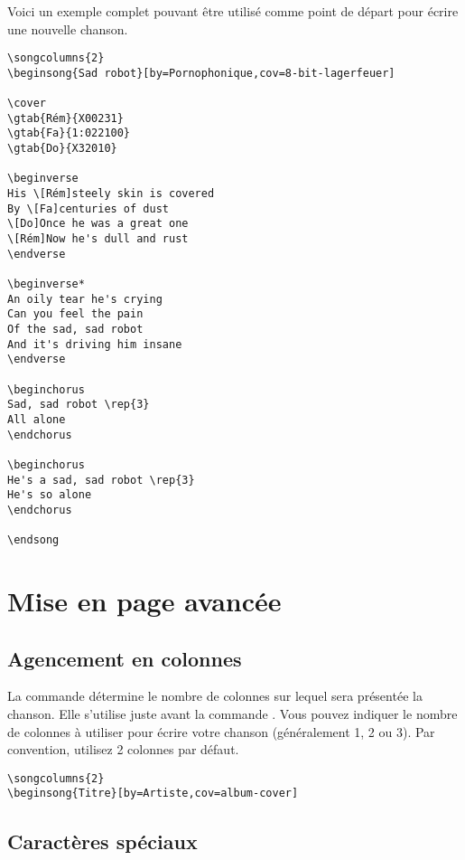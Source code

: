 \documentclass[versionenligne]{patacrep}
\begin{document}
Voici un exemple complet pouvant être utilisé comme point de départ
pour écrire une nouvelle chanson.

\begin{verbatim}
\songcolumns{2}
\beginsong{Sad robot}[by=Pornophonique,cov=8-bit-lagerfeuer]

\cover
\gtab{Rém}{X00231}
\gtab{Fa}{1:022100}
\gtab{Do}{X32010}

\beginverse
His \[Rém]steely skin is covered
By \[Fa]centuries of dust
\[Do]Once he was a great one
\[Rém]Now he's dull and rust
\endverse

\beginverse*
An oily tear he's crying
Can you feel the pain
Of the sad, sad robot
And it's driving him insane
\endverse

\beginchorus
Sad, sad robot \rep{3}
All alone
\endchorus

\beginchorus
He's a sad, sad robot \rep{3}
He's so alone
\endchorus

\endsong
\end{verbatim}

\section{Mise en page avancée}

\subsection{Agencement en colonnes}

La commande  détermine le nombre de colonnes sur
lequel sera présentée la chanson. Elle s'utilise juste avant la
commande . Vous pouvez indiquer le nombre de colonnes
à utiliser pour écrire votre chanson (généralement 1, 2 ou 3). Par
convention, utilisez 2 colonnes par défaut.

\begin{verbatim}
\songcolumns{2}
\beginsong{Titre}[by=Artiste,cov=album-cover]
\end{verbatim}

\subsection{Caractères spéciaux}
\end{document}
